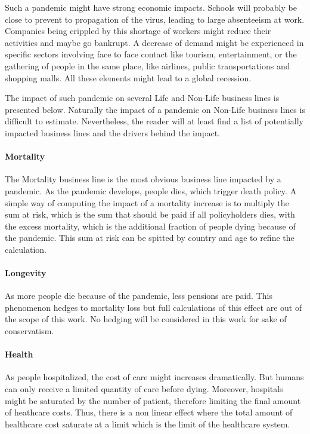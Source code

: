 Such a pandemic might have strong economic impacts. Schools will probably be close to prevent to propagation of the virus, leading to large absenteeism at work. Companies being crippled by this shortage of workers might reduce their activities and maybe go bankrupt. A decrease of demand might be experienced in specific sectors involving face to face contact like tourism, entertainment, or the gathering of people in the same place, like airlines, public transportations and shopping malls. All these elements might lead to a global recession.

The impact of such pandemic on several Life and Non-Life business lines is presented below. Naturally the impact of a pandemic on Non-Life business lines is difficult to estimate. Nevertheless, the reader will at least find a list of potentially impacted business lines and the drivers behind the impact.


\paragraph{Mortality}

The Mortality business line is the most obvious business line impacted by a pandemic. As the pandemic develops, people dies, which trigger death policy. A simple way of computing the impact of a mortality increase is to multiply the sum at risk, which is the sum that should be paid if all policyholders dies, with the excess mortality, which is the additional fraction of people dying because of the pandemic. This sum at risk can be spitted by country and age to refine the calculation.

\paragraph{Longevity}

As more people die because of the pandemic, less pensions are paid. This phenomenon hedges to mortality loss but full calculations of this effect are out of the scope of this work. No hedging will be considered in this work for sake of conservatism.

\paragraph{Health}

As people hospitalized, the cost of care might increases dramatically. But humans can only receive a limited quantity of care before dying. Moreover, hospitals might be saturated by the number of patient, therefore limiting the final amount of heathcare costs. Thus, there is a non linear effect where the total amount of healthcare cost saturate at a limit which is the limit of the healthcare system.


